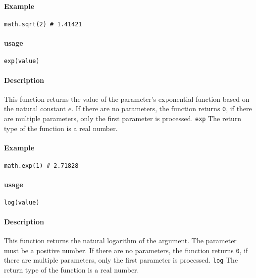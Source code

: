 \paragraph{Example}
\begin{lstlisting}[language=berry, numbers=none]
math.sqrt(2) # 1.41421
\end{lstlisting}

\paragraph{usage}
\begin{lstlisting}[language=berry, numbers=none]
exp(value)
\end{lstlisting}

\paragraph{Description}
This function returns the value of the parameter's exponential function based on the natural constant $e$. If there are no parameters, the function returns \texttt{0}, if there are multiple parameters, only the first parameter is processed. \texttt{exp} The return type of the function is a real number.

\paragraph{Example}
\begin{lstlisting}[language=berry, numbers=none]
math.exp(1) # 2.71828
\end{lstlisting}


\paragraph{usage}
\begin{lstlisting}[language=berry, numbers=none]
log(value)
\end{lstlisting}

\paragraph{Description}
This function returns the natural logarithm of the argument. The parameter must be a positive number. If there are no parameters, the function returns \texttt{0}, if there are multiple parameters, only the first parameter is processed. \texttt{log} The return type of the function is a real number.

